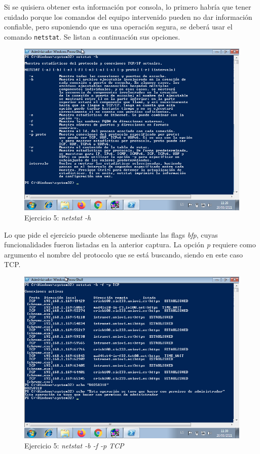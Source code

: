 \documentclass[11pt]{article}
\begin{document}
Si se quisiera obtener esta información por consola, lo primero habría que tener cuidado porque los comandos del equipo intervenido pueden no dar información confiable, pero suponiendo que es una operación segura, se deberá usar el comando \verb|netstat|. Se listan a continuación sus opciones.

\begin{figure}[H]
    \caption{Ejercicio 5: \textit{netstat -h}}
  \centering
    \includegraphics[scale=0.7]{p05/e5-6.png}
\end{figure}

Lo que pide el ejercicio puede obtenerse mediante las flags \textit{bfp}, cuyas funcionalidades fueron listadas en la anterior captura. La opción \textit{p} requiere como argumento el nombre del protocolo que se está buscando, siendo en este caso TCP.

\begin{figure}[H]
    \caption{Ejercicio 5: \textit{netstat -b -f -p TCP}}
  \centering
    \includegraphics[scale=0.7]{p05/e5-7.png}
\end{figure}
\end{document}
